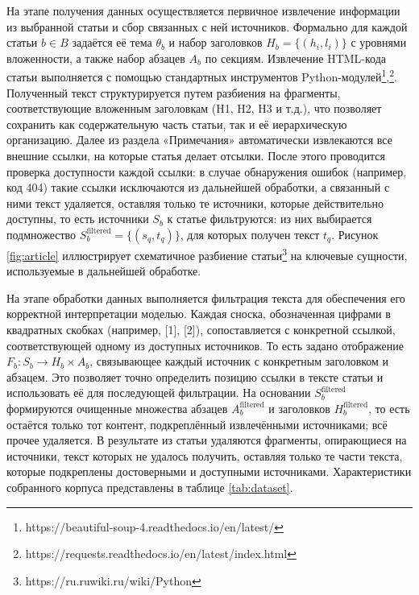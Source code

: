 \documentclass{article}
\theoremstyle{definition}
\theoremstyle{plain}
\begin{document}
На этапе получения данных осуществляется первичное извлечение информации из выбранной статьи и сбор связанных с ней источников. 
Формально для каждой статьи \(b\in B\) задаётся её тема \(\theta_b\) и набор заголовков \(H_b=\{(h_i,l_i)\}\) с уровнями вложенности, а также набор абзацев \(A_b\) по секциям.
Извлечение HTML-кода статьи выполняется с помощью стандартных инструментов Python-модулей\footnote{https://beautiful-soup-4.readthedocs.io/en/latest/},\footnote{https://requests.readthedocs.io/en/latest/index.html}. 
Полученный текст структурируется путем разбиения на фрагменты, соответствующие вложенным заголовкам (H1, H2, H3 и т.д.), что позволяет сохранить как содержательную часть статьи, так и её иерархическую организацию. 
Далее из раздела «Примечания» автоматически извлекаются все внешние ссылки, на которые статья делает отсылки. После этого проводится проверка доступности каждой ссылки: в случае обнаружения ошибок 
(например, код 404) такие ссылки исключаются из дальнейшей обработки, а связанный с ними текст удаляется, оставляя только те источники, которые действительно доступны,
то есть источники \(S_b\) к статье фильтруются: из них выбирается подмножество \(S_b^{\mathrm{filtered}}=\{(s_q,t_q)\}\), для которых получен текст \(t_q\).
Рисунок \ref{fig:article} иллюстрирует схематичное разбиение статьи\footnote{https://ru.ruwiki.ru/wiki/Python} на ключевые сущности, используемые в дальнейшей обработке.


На этапе обработки данных выполняется фильтрация текста для обеспечения его корректной интерпретации моделью. 
Каждая сноска, обозначенная цифрами в квадратных скобках (например, [1], [2]), сопоставляется с конкретной ссылкой, соответствующей одному из доступных источников. 
То есть задано отображение \(F_b: S_b\to H_b\times A_b\), связывающее каждый источник с конкретным заголовком и абзацем.
Это позволяет точно определить позицию ссылки в тексте статьи и использовать её для последующей фильтрации. 
На основании \(S_b^{\mathrm{filtered}}\) формируются очищенные множества абзацев \(A_b^{\mathrm{filtered}}\) и заголовков \(H_b^{\mathrm{filtered}}\), 
то есть остаётся только тот контент, подкреплённый извлечёнными источниками; всё прочее удаляется. 
В результате из статьи удаляются фрагменты, опирающиеся на источники, текст которых не удалось получить, оставляя только те части текста,
которые подкреплены достоверными и доступными источниками. Характеристики собранного корпуса представлены в таблице \ref{tab:dataset}.
\end{document}
